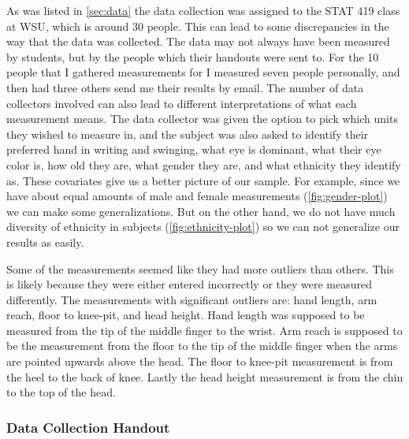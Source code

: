\documentclass[]{article}
\begin{document}
As was listed in \ref{sec:data} the data collection was assigned to the
STAT 419 class at WSU, which is around 30 people. This can lead to some
discrepancies in the way that the data was collected. The data may not
always have been measured by students, but by the people which their
handouts were sent to. For the 10 people that I gathered measurements
for I measured seven people personally, and then had three others send
me their results by email. The number of data collectors involved can
also lead to different interpretations of what each measurement means.
\newline The data collector was given the option to pick which units
they wished to measure in, and the subject was also asked to identify
their preferred hand in writing and swinging, what eye is dominant, what
their eye color is, how old they are, what gender they are, and what
ethnicity they identify as. These covariates give us a better picture of
our sample. For example, since we have about equal amounts of male and
female measurements (\ref{fig:gender-plot}) we can make some
generalizations. But on the other hand, we do not have much diversity of
ethnicity in subjects (\ref{fig:ethnicity-plot}) so we can not
generalize our results as easily.

Some of the measurements seemed like they had more outliers than others.
This is likely because they were either entered incorrectly or they were
measured differently. The measurements with significant outliers are:
hand length, arm reach, floor to knee-pit, and head height. Hand length
was supposed to be measured from the tip of the middle finger to the
wrist. Arm reach is supposed to be the measurement from the floor to the
tip of the middle finger when the arms are pointed upwards above the
head. The floor to knee-pit measurement is from the heel to the back of
knee. Lastly the head height measurement is from the chin to the top of
the head.

\newpage
\subsubsection{Data Collection Handout}
\label{sec:appendix-data-handout}
\end{document}
